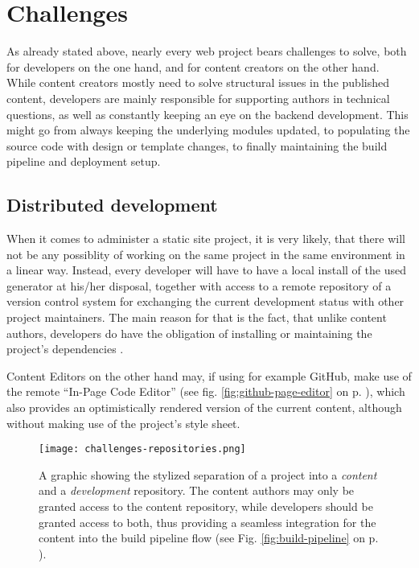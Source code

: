 \section{Challenges}
\label{sec:challenges}

As already stated above, nearly every web project bears challenges to solve, both for developers on the one hand, and for content creators on the other hand. While content creators mostly need to solve structural issues in the published content, developers are mainly responsible for supporting authors in technical questions, as well as constantly keeping an eye on the backend development. This might go from always keeping the underlying modules updated, to populating the source code with design or template changes, to finally maintaining the build pipeline and deployment setup.

\subsection{Distributed development}
\label{sec:challenges-distributeddevelopment}

When it comes to administer a static site project, it is very likely, that there will not be any possiblity of working on the same project in the same environment in a linear way. Instead, every developer will have to have a local install of the used generator at his/her disposal, together with access to a remote repository of a version control system for exchanging the current development status with other project maintainers. The main reason for that is the fact, that unlike content authors, developers do have the obligation of installing or maintaining the project's dependencies \cite[85]{dhillon2016}.

Content Editors on the other hand may, if using for example GitHub, make use of the remote ``In-Page Code Editor'' (see fig. \ref{fig:github-page-editor} on p. \pageref{fig:github-page-editor}), which also provides an optimistically rendered version of the current content, although without making use of the project's style sheet.

\begin{figure} %
    \centering
    \texttt{[image: challenges-repositories.png]}
    \caption{A graphic showing the stylized separation of a project into a \emph{content} and a \emph{development} repository. The content authors may only be granted access to the content repository, while developers should be granted access to both, thus providing a seamless integration for the content into the build pipeline flow (see Fig. \ref{fig:build-pipeline} on p. \pageref{fig:build-pipeline}).}
    \label{fig:repository-separation}
\end{figure}
%

